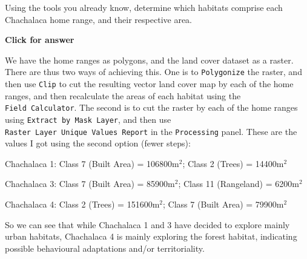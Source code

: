\documentclass[
  letterpaper,
  DIV=11,
  numbers=noendperiod]{scrreprt}
\begin{document}
\begin{tcolorbox}[enhanced jigsaw, coltitle=black, toprule=.15mm, breakable, opacitybacktitle=0.6, left=2mm, colback=white, leftrule=.75mm, rightrule=.15mm, colbacktitle=quarto-callout-important-color!10!white, toptitle=1mm, titlerule=0mm, colframe=quarto-callout-important-color-frame, arc=.35mm, bottomtitle=1mm, opacityback=0, bottomrule=.15mm, title=\textcolor{quarto-callout-important-color}{\faExclamation}\hspace{0.5em}{Stop and Think}]

Using the tools you already know, determine which habitats comprise each
Chachalaca home range, and their respective area.

\end{tcolorbox}

\begin{tcolorbox}[enhanced jigsaw, toprule=.15mm, breakable, left=2mm, colframe=quarto-callout-important-color-frame, colback=white, arc=.35mm, leftrule=.75mm, opacityback=0, rightrule=.15mm, bottomrule=.15mm]

\vspace{-3mm}\textbf{Click for answer}\vspace{3mm}

We have the home ranges as polygons, and the land cover dataset as a
raster. There are thus two ways of achieving this. One is to
\texttt{Polygonize} the raster, and then use \texttt{Clip} to cut the
resulting vector land cover map by each of the home ranges, and then
recalculate the areas of each habitat using the
\texttt{Field\ Calculator}. The second is to cut the raster by each of
the home ranges using \texttt{Extract\ by\ Mask\ Layer}, and then use
\texttt{Raster\ Layer\ Unique\ Values\ Report} in the
\texttt{Processing} panel. These are the values I got using the second
option (fewer steps):

Chachalaca 1: Class 7 (Built Area) = 106800m\(^2\); Class 2 (Trees) =
14400m\(^2\)

Chachalaca 3: Class 7 (Built Area) = 85900m\(^2\); Class 11 (Rangeland)
= 6200m\(^2\)

Chachalaca 4: Class 2 (Trees) = 151600m\(^2\); Class 7 (Built Area) =
79900m\(^2\)

So we can see that while Chachalaca 1 and 3 have decided to explore
mainly urban habitats, Chachalaca 4 is mainly exploring the forest
habitat, indicating possible behavioural adaptations and/or
territoriality.

\end{tcolorbox}
\end{document}
